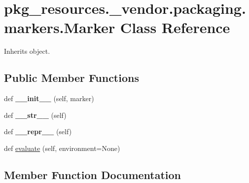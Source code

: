 \hypertarget{classpkg__resources_1_1__vendor_1_1packaging_1_1markers_1_1_marker}{}\section{pkg\+\_\+resources.\+\_\+vendor.\+packaging.\+markers.\+Marker Class Reference}
\label{classpkg__resources_1_1__vendor_1_1packaging_1_1markers_1_1_marker}


Inherits object.

\subsection*{Public Member Functions}
\begin{DoxyCompactItemize}
\item 
\mbox{\label{classpkg__resources_1_1__vendor_1_1packaging_1_1markers_1_1_marker_a4112abb70d23679a4a1993d4351c29e4}} 
def {\bfseries \+\_\+\+\_\+init\+\_\+\+\_\+} (self, marker)
\item 
\mbox{\label{classpkg__resources_1_1__vendor_1_1packaging_1_1markers_1_1_marker_a9b6c2eb60bc5528b3dd11fe64327f88e}} 
def {\bfseries \+\_\+\+\_\+str\+\_\+\+\_\+} (self)
\item 
\mbox{\label{classpkg__resources_1_1__vendor_1_1packaging_1_1markers_1_1_marker_a01dd3667187696572d93832e420590d6}} 
def {\bfseries \+\_\+\+\_\+repr\+\_\+\+\_\+} (self)
\item 
def \hyperlink{classpkg__resources_1_1__vendor_1_1packaging_1_1markers_1_1_marker_a62689e75e765ae2bcfbd0a166c5f8894}{evaluate} (self, environment=None)
\end{DoxyCompactItemize}


\subsection{Member Function Documentation}
\mbox{\label{classpkg__resources_1_1__vendor_1_1packaging_1_1markers_1_1_marker_a62689e75e765ae2bcfbd0a166c5f8894}} 
